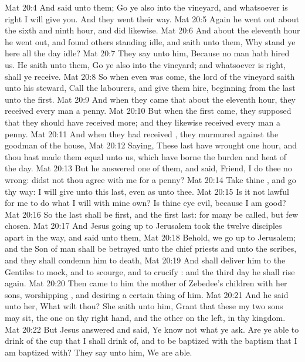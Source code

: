 \vs Mat 20:4 And said unto them; Go ye also into the vineyard, and whatsoever is right I will give you. And they went their way.
\vs Mat 20:5 Again he went out about the sixth and ninth hour, and did likewise.
\vs Mat 20:6 And about the eleventh hour he went out, and found others standing idle, and saith unto them, Why stand ye here all the day idle?
\vs Mat 20:7 They say unto him, Because no man hath hired us. He saith unto them, Go ye also into the vineyard; and whatsoever is right,  shall ye receive.
\vs Mat 20:8 So when even was come, the lord of the vineyard saith unto his steward, Call the labourers, and give them  hire, beginning from the last unto the first.
\vs Mat 20:9 And when they came that  about the eleventh hour, they received every man a penny.
\vs Mat 20:10 But when the first came, they supposed that they should have received more; and they likewise received every man a penny.
\vs Mat 20:11 And when they had received , they murmured against the goodman of the house,
\vs Mat 20:12 Saying, These last have wrought  one hour, and thou hast made them equal unto us, which have borne the burden and heat of the day.
\vs Mat 20:13 But he answered one of them, and said, Friend, I do thee no wrong: didst not thou agree with me for a penny?
\vs Mat 20:14 Take  thine , and go thy way: I will give unto this last, even as unto thee.
\vs Mat 20:15 Is it not lawful for me to do what I will with mine own? Is thine eye evil, because I am good?
\vs Mat 20:16 So the last shall be first, and the first last: for many be called, but few chosen.
\vs Mat 20:17 And Jesus going up to Jerusalem took the twelve disciples apart in the way, and said unto them,
\vs Mat 20:18 Behold, we go up to Jerusalem; and the Son of man shall be betrayed unto the chief priests and unto the scribes, and they shall condemn him to death,
\vs Mat 20:19 And shall deliver him to the Gentiles to mock, and to scourge, and to crucify : and the third day he shall rise again.
\vs Mat 20:20 Then came to him the mother of Zebedee's children with her sons, worshipping , and desiring a certain thing of him.
\vs Mat 20:21 And he said unto her, What wilt thou? She saith unto him, Grant that these my two sons may sit, the one on thy right hand, and the other on the left, in thy kingdom.
\vs Mat 20:22 But Jesus answered and said, Ye know not what ye ask. Are ye able to drink of the cup that I shall drink of, and to be baptized with the baptism that I am baptized with? They say unto him, We are able.
